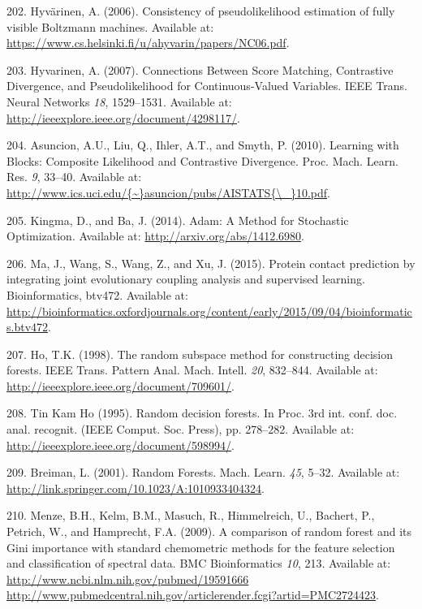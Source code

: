 \documentclass[11pt,a4paper,twoside]{book}
\theoremstyle{definition}
\theoremstyle{definition}
\theoremstyle{remark}
\begin{document}
\hypertarget{ref-Hyvarinen2006}{}
202. Hyvärinen, A. (2006). Consistency of pseudolikelihood estimation of
fully visible Boltzmann machines. Available at:
\url{https://www.cs.helsinki.fi/u/ahyvarin/papers/NC06.pdf}.

\hypertarget{ref-Hyvarinen2007}{}
203. Hyvarinen, A. (2007). Connections Between Score Matching,
Contrastive Divergence, and Pseudolikelihood for Continuous-Valued
Variables. IEEE Trans. Neural Networks \emph{18}, 1529--1531. Available
at: \url{http://ieeexplore.ieee.org/document/4298117/}.

\hypertarget{ref-Asuncion2010}{}
204. Asuncion, A.U., Liu, Q., Ihler, A.T., and Smyth, P. (2010).
Learning with Blocks: Composite Likelihood and Contrastive Divergence.
Proc. Mach. Learn. Res. \emph{9}, 33--40. Available at:
\href{http://www.ics.uci.edu/\%7B~\%7Dasuncion/pubs/AISTATS\%7B/_\%7D10.pdf}{http://www.ics.uci.edu/\{\textasciitilde{}\}asuncion/pubs/AISTATS\{\textbackslash{}\_\}10.pdf}.

\hypertarget{ref-Kingma2014}{}
205. Kingma, D., and Ba, J. (2014). Adam: A Method for Stochastic
Optimization. Available at: \url{http://arxiv.org/abs/1412.6980}.

\hypertarget{ref-Ma2015a}{}
206. Ma, J., Wang, S., Wang, Z., and Xu, J. (2015). Protein contact
prediction by integrating joint evolutionary coupling analysis and
supervised learning. Bioinformatics, btv472. Available at:
\url{http://bioinformatics.oxfordjournals.org/content/early/2015/09/04/bioinformatics.btv472}.

\hypertarget{ref-Ho1998}{}
207. Ho, T.K. (1998). The random subspace method for constructing
decision forests. IEEE Trans. Pattern Anal. Mach. Intell. \emph{20},
832--844. Available at:
\url{http://ieeexplore.ieee.org/document/709601/}.

\hypertarget{ref-TinKamHo}{}
208. Tin Kam Ho (1995). Random decision forests. In Proc. 3rd int. conf.
doc. anal. recognit. (IEEE Comput. Soc. Press), pp. 278--282. Available
at: \url{http://ieeexplore.ieee.org/document/598994/}.

\hypertarget{ref-Breiman2001}{}
209. Breiman, L. (2001). Random Forests. Mach. Learn. \emph{45}, 5--32.
Available at: \url{http://link.springer.com/10.1023/A:1010933404324}.

\hypertarget{ref-Menze2009}{}
210. Menze, B.H., Kelm, B.M., Masuch, R., Himmelreich, U., Bachert, P.,
Petrich, W., and Hamprecht, F.A. (2009). A comparison of random forest
and its Gini importance with standard chemometric methods for the
feature selection and classification of spectral data. BMC
Bioinformatics \emph{10}, 213. Available at:
\href{http://www.ncbi.nlm.nih.gov/pubmed/19591666\%20http://www.pubmedcentral.nih.gov/articlerender.fcgi?artid=PMC2724423}{http://www.ncbi.nlm.nih.gov/pubmed/19591666 http://www.pubmedcentral.nih.gov/articlerender.fcgi?artid=PMC2724423}.
\end{document}
